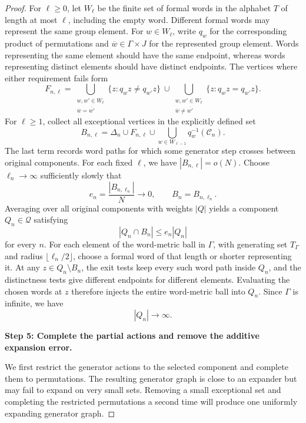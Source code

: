 \documentclass[10pt]{article}
\newcommand{\stephead}[1]{\par\medskip\noindent\textbf{#1}\par\smallskip}
\newcommand{\abs}[1]{\left|#1\right|}
\begin{document}
\begin{proof}
For $\ell\geq0$, let $W_\ell$ be the finite set of formal words in the alphabet $T$ of length at most $\ell$, including the empty word. Different formal words may represent the same group element. For $w\in W_\ell$, write $q_w$ for the corresponding product of permutations and $\overline w\in\Gamma\times J$ for the represented group element. Words representing the same element should have the same endpoint, whereas words representing distinct elements should have distinct endpoints. The vertices where either requirement fails form
\[
F_{n,\ell}=
\bigcup_{\substack{w,w'\in W_\ell\\\overline w=\overline{w'}}}
\{z:q_wz\neq q_{w'}z\}
\ \cup\!
\bigcup_{\substack{w,w'\in W_\ell\\\overline w\neq\overline{w'}}}
\{z:q_wz=q_{w'}z\}.
\]
For $\ell\geq1$, collect all exceptional vertices in the explicitly defined set
\[
B_{n,\ell}=\Delta_n\cup F_{n,\ell}\cup\bigcup_{w\in W_{\ell-1}}q_w^{-1}(\mathcal C_n).
\]
The last term records word paths for which some generator step crosses between original components. For each fixed $\ell$, we have $\abs{B_{n,\ell}}=o(N)$. Choose $\ell_n\to\infty$ sufficiently slowly that
\[
e_n=\frac{\abs{B_{n,\ell_n}}}{N}\longrightarrow0,\qquad B_n=B_{n,\ell_n}.
\]
Averaging over all original components with weights $\abs{Q}$ yields a component $Q_n\in\mathcal Q$ satisfying
\begin{equation}
\abs{Q_n\cap B_n}\leq e_n\abs{Q_n}
\tag{12}
\end{equation}
for every $n$. For each element of the word-metric ball in $\Gamma$, with generating set $T_\Gamma$ and radius $\lfloor\ell_n/2\rfloor$, choose a formal word of that length or shorter representing it. At any $z\in Q_n\setminus B_n$, the exit tests keep every such word path inside $Q_n$, and the distinctness tests give different endpoints for different elements. Evaluating the chosen words at $z$ therefore injects the entire word-metric ball into $Q_n$. Since $\Gamma$ is infinite, we have
\[
\abs{Q_n}\longrightarrow\infty.
\]

\stephead{Step 5: Complete the partial actions and remove the additive expansion error.}
We first restrict the generator actions to the selected component and complete them to permutations. The resulting generator graph is close to an expander but may fail to expand on very small sets. Removing a small exceptional set and completing the restricted permutations a second time will produce one uniformly expanding generator graph.


\end{proof}
\end{document}
